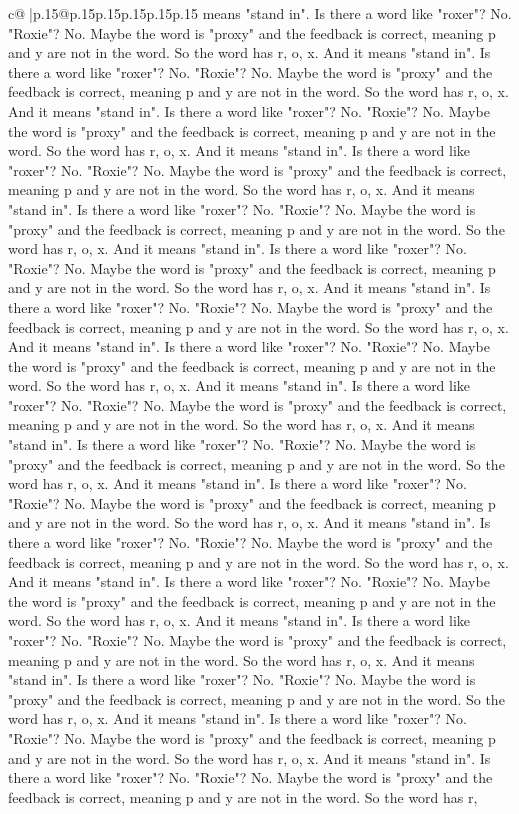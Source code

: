 \documentclass{article}
\begin{document}
{\begin{supertabular}{c@{$\;$}|p{.15\linewidth}@{}p{.15\linewidth}p{.15\linewidth}p{.15\linewidth}p{.15\linewidth}p{.15\linewidth}}
{{{means "stand in". Is there a word like "roxer"? No. "Roxie"? No. Maybe the word is "proxy" and the feedback is correct, meaning p and y are not in the word. So the word has r, o, x. And it means "stand in". Is there a word like "roxer"? No. "Roxie"? No. Maybe the word is "proxy" and the feedback is correct, meaning p and y are not in the word. So the word has r, o, x. And it means "stand in". Is there a word like "roxer"? No. "Roxie"? No. Maybe the word is "proxy" and the feedback is correct, meaning p and y are not in the word. So the word has r, o, x. And it means "stand in". Is there a word like "roxer"? No. "Roxie"? No. Maybe the word is "proxy" and the feedback is correct, meaning p and y are not in the word. So the word has r, o, x. And it means "stand in". Is there a word like "roxer"? No. "Roxie"? No. Maybe the word is "proxy" and the feedback is correct, meaning p and y are not in the word. So the word has r, o, x. And it means "stand in". Is there a word like "roxer"? No. "Roxie"? No. Maybe the word is "proxy" and the feedback is correct, meaning p and y are not in the word. So the word has r, o, x. And it means "stand in". Is there a word like "roxer"? No. "Roxie"? No. Maybe the word is "proxy" and the feedback is correct, meaning p and y are not in the word. So the word has r, o, x. And it means "stand in". Is there a word like "roxer"? No. "Roxie"? No. Maybe the word is "proxy" and the feedback is correct, meaning p and y are not in the word. So the word has r, o, x. And it means "stand in". Is there a word like "roxer"? No. "Roxie"? No. Maybe the word is "proxy" and the feedback is correct, meaning p and y are not in the word. So the word has r, o, x. And it means "stand in". Is there a word like "roxer"? No. "Roxie"? No. Maybe the word is "proxy" and the feedback is correct, meaning p and y are not in the word. So the word has r, o, x. And it means "stand in". Is there a word like "roxer"? No. "Roxie"? No. Maybe the word is "proxy" and the feedback is correct, meaning p and y are not in the word. So the word has r, o, x. And it means "stand in". Is there a word like "roxer"? No. "Roxie"? No. Maybe the word is "proxy" and the feedback is correct, meaning p and y are not in the word. So the word has r, o, x. And it means "stand in". Is there a word like "roxer"? No. "Roxie"? No. Maybe the word is "proxy" and the feedback is correct, meaning p and y are not in the word. So the word has r, o, x. And it means "stand in". Is there a word like "roxer"? No. "Roxie"? No. Maybe the word is "proxy" and the feedback is correct, meaning p and y are not in the word. So the word has r, o, x. And it means "stand in". Is there a word like "roxer"? No. "Roxie"? No. Maybe the word is "proxy" and the feedback is correct, meaning p and y are not in the word. So the word has r, o, x. And it means "stand in". Is there a word like "roxer"? No. "Roxie"? No. Maybe the word is "proxy" and the feedback is correct, meaning p and y are not in the word. So the word has r, o, x. And it means "stand in". Is there a word like "roxer"? No. "Roxie"? No. Maybe the word is "proxy" and the feedback is correct, meaning p and y are not in the word. So the word has r, }}}
\end{supertabular}}
\end{document}
